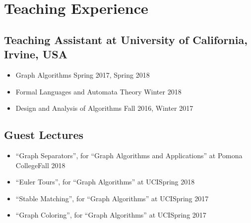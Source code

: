 \documentclass[letterpaper,10pt,oneside]{article}
\begin{document}
\section*{Teaching Experience}
\subsection*{Teaching Assistant at University of California, Irvine, USA}
\begin{itemize}
    \item Graph Algorithms \hfill Spring 2017, Spring 2018
    \item Formal Languages and Automata Theory \hfill Winter 2018
    \item Design and Analysis of Algorithms \hfill Fall 2016, Winter 2017
\end{itemize}
\subsection*{Guest Lectures}
\begin{itemize}
	\item ``Graph Separators'', for ``Graph Algorithms and Applications'' at Pomona College\hfill Fall 2018
	\item ``Euler Tours'', for ``Graph Algorithms'' at UCI\hfill Spring 2018
	\item ``Stable Matching'', for ``Graph Algorithms'' at UCI\hfill Spring 2017
	\item ``Graph Coloring'',  for ``Graph Algorithms'' at UCI\hfill Spring 2017
\end{itemize}
\end{document}
